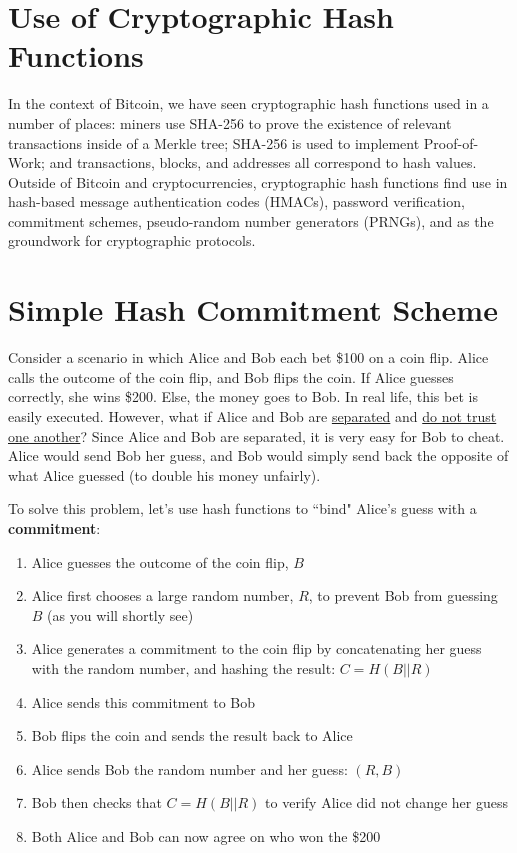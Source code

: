 \documentclass[full.tex]{subfiles}
\begin{document}
   \section*{Use of Cryptographic Hash Functions}
   
   In the context of Bitcoin, we have seen cryptographic hash functions used in a number of places: miners use SHA-256 to prove the existence of relevant transactions inside of a Merkle tree; SHA-256 is used to implement Proof-of-Work; and transactions, blocks, and addresses all correspond to hash values. Outside of Bitcoin and cryptocurrencies, cryptographic hash functions find use in hash-based message authentication codes (HMACs), password verification, commitment schemes, pseudo-random number generators (PRNGs), and as the groundwork for cryptographic protocols.
   
    \section*{Simple Hash Commitment Scheme}
   
    Consider a scenario in which Alice and Bob each bet \$100 on a coin flip. Alice calls the outcome of the coin flip, and Bob flips the coin. If Alice guesses correctly, she wins \$200. Else, the money goes to Bob. In real life, this bet is easily executed. However, what if Alice and Bob are \underline{separated} and \underline{do not trust one another}? Since Alice and Bob are separated, it is very easy for Bob to cheat. Alice would send Bob her guess, and Bob would simply send back the opposite of what Alice guessed (to double his money unfairly).
    
    To solve this problem, let's use hash functions to ``bind" Alice's guess with a \textbf{commitment}:
    
    \begin{enumerate}
        \item Alice guesses the outcome of the coin flip, $B$
        \item Alice first chooses a large random number, $R$, to prevent Bob from guessing $B$ (as you will shortly see)
        \item Alice generates a commitment to the coin flip by concatenating her guess with the random number, and hashing the result: $C = H(B||R)$
        \item Alice sends this commitment to Bob
        \item Bob flips the coin and sends the result back to Alice
        \item Alice sends Bob the random number and her guess: $(R, B)$
        \item Bob then checks that $C = H(B||R)$ to verify Alice did not change her guess
        \item Both Alice and Bob can now agree on who won the \$200
    \end{enumerate}
    
\end{document}
